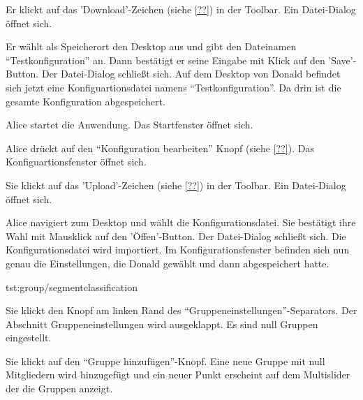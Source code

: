 \documentclass[parskip=full,11pt]{scrartcl}
\begin{document}
{Er klickt auf das 'Download'-Zeichen (siehe \cref{??}) in der Toolbar.}
{Ein Datei-Dialog öffnet sich.}

{Er wählt als Speicherort den Desktop aus und gibt den Dateinamen \enquote{Testkonfiguration} an. Dann bestätigt er seine Eingabe mit Klick auf den 'Save'-Button.}
{Der Datei-Dialog schließt sich. Auf dem Desktop von Donald befindet sich jetzt eine Konfiguartionsdatei namens \enquote{Testkonfiguration}. Da drin ist die gesamte Konfiguration abgespeichert.}

{Alice startet die Anwendung.}
{Das Startfenster öffnet sich.}

{Alice drückt auf den \enquote{Konfiguration bearbeiten} Knopf (siehe \cref{??}).}
{Das Konfiguartionsfenster öffnet sich.}

{Sie klickt auf das 'Upload'-Zeichen (siehe \cref{??}) in der Toolbar.}
{Ein Datei-Dialog öffnet sich.}

{Alice navigiert zum Desktop und wählt die Konfigurationsdatei. Sie bestätigt ihre Wahl mit Mausklick auf den 'Öffen'-Button.}
{Der Datei-Dialog schließt sich. Die Konfigurationsdatei wird importiert. Im Konfigurationsfenster befinden sich nun genau die Einstellungen, die Donald gewählt und dann abgespeichert hatte.}

{tst:group/segmentclassification}

{Sie klickt den Knopf am linken Rand des \enquote{Gruppeneinstellungen}-Separators.}
{Der Abschnitt Gruppeneinstellungen wird ausgeklappt. Es sind null Gruppen eingestellt.}

{Sie klickt auf den \enquote{Gruppe hinzufügen}-Knopf.}
{Eine neue Gruppe mit null Mitgliedern wird hinzugefügt und ein neuer Punkt erscheint auf dem Multislider der die Gruppen anzeigt.}
\end{document}
